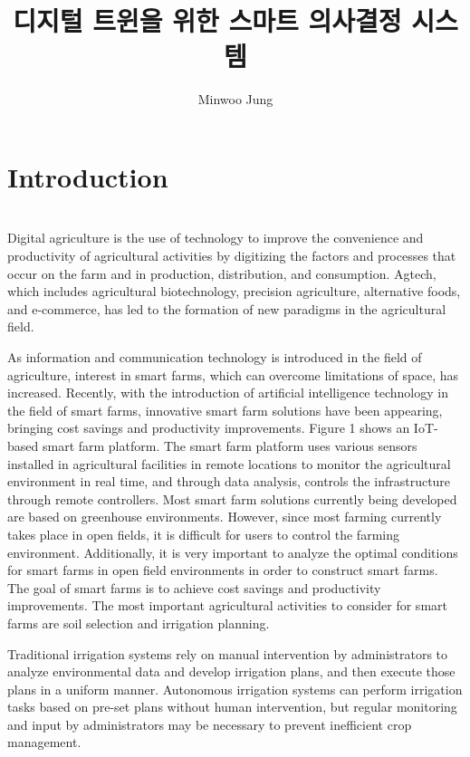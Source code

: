 \documentclass[11pt]{article}
\title{디지털 트윈을 위한 스마트 의사결정 시스템}
\author{Minwoo Jung}
\begin{document}
\maketitle

\section{Introduction}
\indent \\Digital agriculture is the use of technology to improve the convenience and productivity of agricultural activities by digitizing the factors and processes that occur on the farm and in production, distribution, and consumption. Agtech, which includes agricultural biotechnology, precision agriculture, alternative foods, and e-commerce, has led to the formation of new paradigms in the agricultural field.

As information and communication technology is introduced in the field of agriculture, interest in smart farms, which can overcome limitations of space, has increased. Recently, with the introduction of artificial intelligence technology in the field of smart farms, innovative smart farm solutions have been appearing, bringing cost savings and productivity improvements. Figure 1 shows an IoT-based smart farm platform. The smart farm platform uses various sensors installed in agricultural facilities in remote locations to monitor the agricultural environment in real time, and through data analysis, controls the infrastructure through remote controllers. Most smart farm solutions currently being developed are based on greenhouse environments. However, since most farming currently takes place in open fields, it is difficult for users to control the farming environment. Additionally, it is very important to analyze the optimal conditions for smart farms in open field environments in order to construct smart farms. The goal of smart farms is to achieve cost savings and productivity improvements. The most important agricultural activities to consider for smart farms are soil selection and irrigation planning.

Traditional irrigation systems rely on manual intervention by administrators to analyze environmental data and develop irrigation plans, and then execute those plans in a uniform manner. Autonomous irrigation systems can perform irrigation tasks based on pre-set plans without human intervention, but regular monitoring and input by administrators may be necessary to prevent inefficient crop management.
\end{document}
